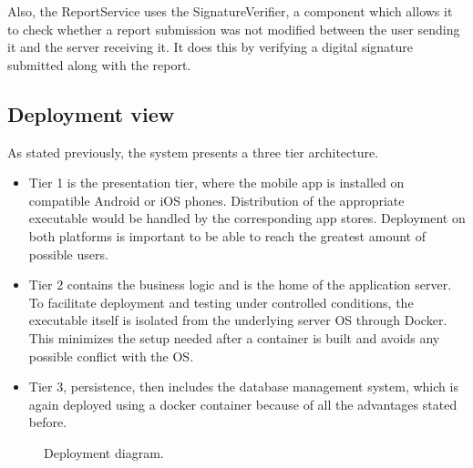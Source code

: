 Also, the ReportService uses the SignatureVerifier, a component which allows it to check whether a report submission was not modified between the user sending it and the server receiving it. It does this by verifying a digital signature submitted along with the report.

\subsection{Deployment view}

As stated previously, the system presents a three tier architecture.
\begin{itemize}
    \item Tier 1 is the presentation tier, where the mobile app is installed on compatible Android or iOS phones. Distribution of the appropriate executable would be handled by the corresponding app stores. Deployment on both platforms is important to be able to reach the greatest amount of possible users.
    \item Tier 2 contains the business logic and is the home of the application server. To facilitate deployment and testing under controlled conditions, the executable itself is isolated from the underlying server OS through Docker. This minimizes the setup needed after a container is built and avoids any possible conflict with the OS.
    \item Tier 3, persistence, then includes the database management system, which is again deployed using a docker container because of all the advantages stated before. 
\end{itemize}

\begin{figure}[H]
    \centering
    \caption{\label{fig:deployment-diagram}Deployment diagram.}
\end{figure}

